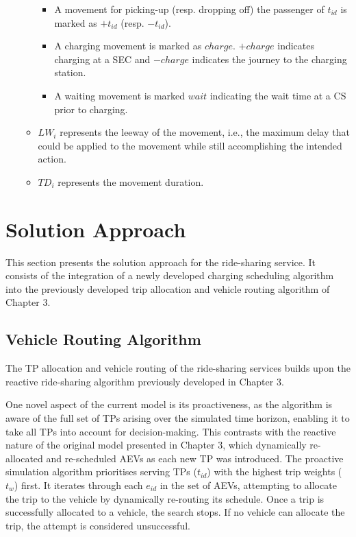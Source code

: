 \begin{itemize}
\begin{itemize}
        \begin{itemize}
            \item A movement for picking-up (resp. dropping off) the passenger of $t_{id}$ is marked as $+t_{id}$ (resp. $-t_{id}$).
            \item A charging movement is marked as $charge$. $+charge$ indicates charging at a SEC and $-charge$ indicates the journey to the charging station.
            \item A waiting movement is marked $wait$ indicating the wait time at a CS prior to charging.
        \end{itemize}
        \item $LW_i$ represents the leeway of the movement, i.e., the maximum delay that could be applied to the movement while still accomplishing the intended action.
        \item $TD_i$ represents the movement duration.
    \end{itemize}
\end{itemize}

\section{Solution Approach}
\label{sec:solution_approach}

This section presents the solution approach for the ride-sharing service. It consists of the integration of a newly developed charging scheduling algorithm into the previously developed trip allocation and vehicle routing algorithm of Chapter 3. 

\subsection{Vehicle Routing Algorithm}
\label{vehicle-allocation-algorithm}
The TP allocation and vehicle routing of the ride-sharing services builds upon the reactive ride-sharing algorithm previously developed in Chapter 3. 

One novel aspect of the current model is its proactiveness, as the algorithm is aware of the full set of TPs arising over the simulated time horizon, enabling it to take all TPs into account for decision-making. This contrasts with the reactive nature of the original model presented in Chapter 3, which dynamically re-allocated and re-scheduled AEVs as each new TP was introduced. The proactive simulation algorithm prioritises serving TPs ($t_{id}$) with the highest trip weights ($t_w$) first. It iterates through each $e_{id}$ in the set of AEVs, attempting to allocate the trip to the vehicle by dynamically re-routing its schedule. Once a trip is successfully allocated to a vehicle, the search stops. If no vehicle can allocate the trip, the attempt is considered unsuccessful.

